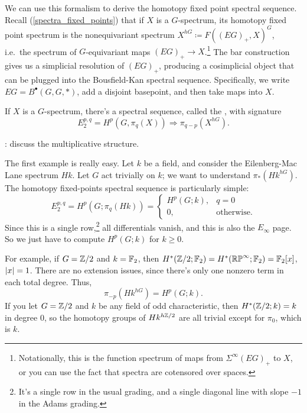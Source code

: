 We can use this formalism to derive the homotopy fixed point spectral sequence. Recall
(\cref{spectra_fixed_points}) that if $X$ is a $G$-spectrum, its homotopy fixed point spectrum is the nonequivariant spectrum $X^{hG}\coloneqq F((EG)_+, X)^G$, i.e.\ the spectrum
of $G$-equivariant maps $(EG)_+\to X$.\footnote{Notationally, this is the function spectrum of maps from
$\Sigma^\infty (EG)_+$ to $X$, or you can use the fact that spectra are cotensored over spaces.} The bar
construction gives us a simplicial resolution of $(EG)_+$, producing a cosimplicial object
that can be plugged into the Bousfield-Kan spectral sequence. Specifically, we write $EG = B^\bullet(G,G,*)$, add
a disjoint basepoint, and then take maps into $X$.
\begin{thm}
\label{HFPSS}
If $X$ is a $G$-spectrum, there's a spectral sequence, called the
, with signature
\[E_2^{p,q} = H^p(G, \pi_q(X))\Longrightarrow \pi_{q-p}(X^{hG}).\]
\end{thm}
\TODO: discuss the multiplicative structure.
\begin{exm}
The first example is really easy. Let $k$ be a field, and consider the Eilenberg-Mac Lane spectrum $Hk$. Let $G$
act trivially on $k$; we want to understand $\pi_*(Hk^{hG})$. The homotopy fixed-points spectral sequence is
particularly simple:
\[E_2^{p,q} = H^p(G; \pi_q(Hk)) = \begin{cases}
	H^p(G; k), &q = 0\\
	0, &\text{otherwise.}
\end{cases}\]
Since this is a single row,\footnote{It's a single row in the usual grading, and a single diagonal line with slope
$-1$ in the Adams grading.} all differentials vanish, and this is also the $E_\infty$ page. So
we just have to compute $H^p(G;k)$ for $k\ge 0$.

For example, if $G = \mathbb Z/2$ and $k = \mathbb F_2$, then $H^*(\mathbb Z/2; \mathbb F_2) = H^*(\mathbb{RP}^\infty;\mathbb F_2) = \mathbb F_2[x]$, $\lvert x\rvert = 1$.
There are no extension issues, since there's only one nonzero term in each total degree. Thus,
\[\pi_{-p}(Hk^{hG}) = H^p(G; k).\]
If you let $G = \mathbb Z/2$ and $k$ be any field of odd characteristic, then $H^*(\mathbb Z/2; k) = k$ in degree $0$, so the
homotopy groups of $Hk^{h\mathbb Z/2}$ are all trivial except for $\pi_0$, which is $k$.
\end{exm}
